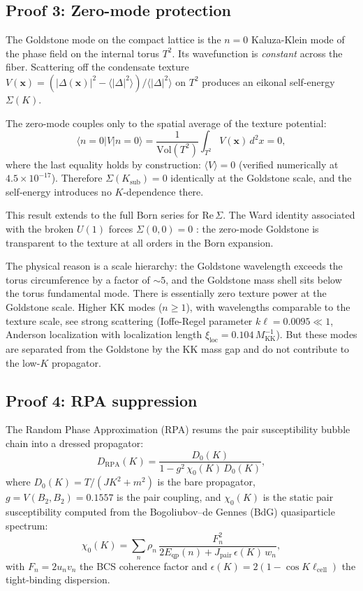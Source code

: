 \documentclass[12pt]{article}
\theoremstyle{definition}
\theoremstyle{remark}
\begin{document}
\subsection{Proof 3: Zero-mode protection}\label{sec:proof3}

The Goldstone mode on the compact lattice is the $n = 0$ Kaluza-Klein mode of the phase field on the internal torus $T^2$. Its wavefunction is \emph{constant} across the fiber. Scattering off the condensate texture $V(\mathbf{x}) = (|\Delta(\mathbf{x})|^2 - \langle|\Delta|^2\rangle)/\langle|\Delta|^2\rangle$ on $T^2$ produces an eikonal self-energy $\Sigma(K)$.

The zero-mode couples only to the spatial average of the texture potential:
\begin{equation}
  \langle n = 0 | V | n = 0 \rangle = \frac{1}{\mathrm{Vol}(T^2)} \int_{T^2} V(\mathbf{x})\,d^2x = 0,
\end{equation}
where the last equality holds by construction: $\langle V \rangle = 0$ (verified numerically at $4.5 \times 10^{-17}$). Therefore $\Sigma(K_{\mathrm{sub}}) = 0$ identically at the Goldstone scale, and the self-energy introduces no $K$-dependence there.

This result extends to the full Born series for $\mathrm{Re}\,\Sigma$. The Ward identity associated with the broken $U(1)$ forces $\Sigma(0, 0) = 0$ \citep{WeinbergQFT2}: the zero-mode Goldstone is transparent to the texture at all orders in the Born expansion.

The physical reason is a scale hierarchy: the Goldstone wavelength exceeds the torus circumference by a factor of $\sim 5$, and the Goldstone mass shell sits below the torus fundamental mode. There is essentially zero texture power at the Goldstone scale. Higher KK modes ($n \geq 1$), with wavelengths comparable to the texture scale, see strong scattering (Ioffe-Regel parameter $k\ell = 0.0095 \ll 1$, Anderson localization with localization length $\xi_{\mathrm{loc}} = 0.104\,M_{\mathrm{KK}}^{-1}$). But these modes are separated from the Goldstone by the KK mass gap and do not contribute to the low-$K$ propagator.

\subsection{Proof 4: RPA suppression}\label{sec:proof4}

The Random Phase Approximation (RPA) resums the pair susceptibility bubble chain into a dressed propagator:
\begin{equation}\label{eq:RPA}
  D_{\mathrm{RPA}}(K) = \frac{D_0(K)}{1 - g^2\,\chi_0(K)\,D_0(K)},
\end{equation}
where $D_0(K) = T/(JK^2 + m^2)$ is the bare propagator, $g = V(B_2, B_2) = 0.1557$ is the pair coupling, and $\chi_0(K)$ is the static pair susceptibility computed from the Bogoliubov--de Gennes (BdG) quasiparticle spectrum:
\begin{equation}
  \chi_0(K) = \sum_n \rho_n\,\frac{F_n^2}{2E_{\mathrm{qp}}(n) + J_{\mathrm{pair}}\,\epsilon(K)\,w_n},
\end{equation}
with $F_n = 2u_n v_n$ the BCS coherence factor and $\epsilon(K) = 2(1 - \cos K \ell_{\mathrm{cell}})$ the tight-binding dispersion.
\end{document}
